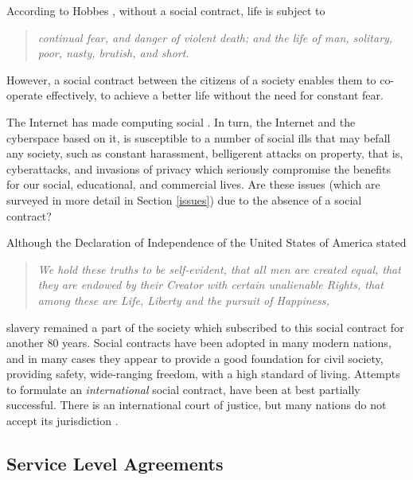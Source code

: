 \iffalse
The modern
resurgence of the social contract is associated with the philosophers
Hobbes \cite{Leviathan}, circa 1650, Locke, Voltaire, and Rousseau and also with great
political changes in England, the United States, and France in which
individuals outside the privileged classes, and large communities of
such individuals made major contributions toward the theoretical
and practical implementation of a social contract in England, the United
States, and France \cite{Goodall}.
\fi

According to Hobbes \cite{Leviathan}, without a social contract, life is subject to
\begin{quote}\em
continual fear, and danger of violent death; and the life of man, solitary, poor, nasty, brutish, and short.
\end{quote}
However, a social contract between the citizens of a society enables them to co-operate
effectively, to achieve a better life without the need for constant fear.

The Internet has made computing social \cite{parameswaran2007social}. In
turn, the Internet and the cyberspace based on it, is susceptible to
a number of social ills that may befall any society, such as constant
harassment, belligerent attacks on property, that is, cyberattacks,
and invasions of privacy which seriously compromise the benefits for our
social, educational, and commercial lives. Are these issues (which are
surveyed in more detail in Section \ref{issues}) due to the absence
of a social contract?

Although the Declaration of Independence of the United States of America stated
\begin{quote}\em
We hold these truths to be self-evident, that all men are created equal,
that they are endowed by their Creator with certain unalienable Rights,
that among these are Life, Liberty and the pursuit of Happiness,
\end{quote}
slavery remained a part of the society which subscribed to this social contract
for another 80 years. 
%
Social contracts have been adopted in many modern nations, and in many cases they
appear to provide a good foundation for civil society, providing safety, wide-ranging 
freedom, with a high standard of living. Attempts to formulate an {\em international}
social contract, have been at best partially successful. There is an international court
of justice, but many nations do not accept its jurisdiction \cite{Robertson}.


\subsection{Service Level Agreements}\label{slasec1}

